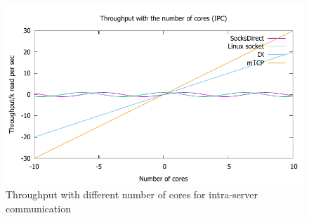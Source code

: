 \begin{figure}[htpb]
	\centering
	\includegraphics[width=\columnwidth]{eval/microbenchmark/cornum-IPC.pdf}
	\caption{Throughput with different number of cores for intra-server communication}
	\label{fig:eval-cornum-ipc}
\end{figure}

